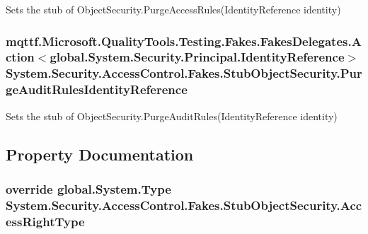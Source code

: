Sets the stub of Object\-Security.\-Purge\-Access\-Rules(\-Identity\-Reference identity)

\hypertarget{class_system_1_1_security_1_1_access_control_1_1_fakes_1_1_stub_object_security_ad7d3e305597b7e952bee365be0b785fc}{
\subsubsection[{Purge\-Audit\-Rules\-Identity\-Reference}]{\setlength{\rightskip}{0pt plus 5cm}mqttf.\-Microsoft.\-Quality\-Tools.\-Testing.\-Fakes.\-Fakes\-Delegates.\-Action$<$global.\-System.\-Security.\-Principal.\-Identity\-Reference$>$ System.\-Security.\-Access\-Control.\-Fakes.\-Stub\-Object\-Security.\-Purge\-Audit\-Rules\-Identity\-Reference}}\label{class_system_1_1_security_1_1_access_control_1_1_fakes_1_1_stub_object_security_ad7d3e305597b7e952bee365be0b785fc}


Sets the stub of Object\-Security.\-Purge\-Audit\-Rules(\-Identity\-Reference identity)



\subsection{Property Documentation}
\hypertarget{class_system_1_1_security_1_1_access_control_1_1_fakes_1_1_stub_object_security_a5ef96307df99e86a7126def72dfc566b}{
\subsubsection[{Access\-Right\-Type}]{\setlength{\rightskip}{0pt plus 5cm}override global.\-System.\-Type System.\-Security.\-Access\-Control.\-Fakes.\-Stub\-Object\-Security.\-Access\-Right\-Type\hspace{0.3cm}{\ttfamily [get]}}}\label{class_system_1_1_security_1_1_access_control_1_1_fakes_1_1_stub_object_security_a5ef96307df99e86a7126def72dfc566b}


